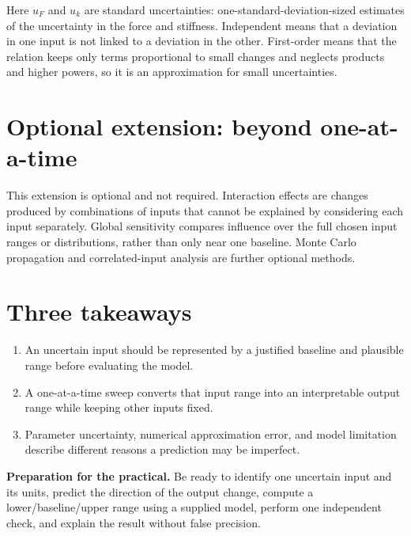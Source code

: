 \documentclass[11pt,a4paper]{article}
\begin{document}
Here $u_F$ and $u_k$ are standard uncertainties: one-standard-deviation-sized estimates of the uncertainty in the force and stiffness. Independent means that a deviation in one input is not linked to a deviation in the other. First-order means that the relation keeps only terms proportional to small changes and neglects products and higher powers, so it is an approximation for small uncertainties.

\section*{Optional extension: beyond one-at-a-time}
This extension is optional and not required. Interaction effects are changes produced by combinations of inputs that cannot be explained by considering each input separately. Global sensitivity compares influence over the full chosen input ranges or distributions, rather than only near one baseline. Monte Carlo propagation and correlated-input analysis are further optional methods.

\section*{Three takeaways}
\begin{enumerate}[nosep,leftmargin=7mm]
\item An uncertain input should be represented by a justified baseline and plausible range before evaluating the model.
\item A one-at-a-time sweep converts that input range into an interpretable output range while keeping other inputs fixed.
\item Parameter uncertainty, numerical approximation error, and model limitation describe different reasons a prediction may be imperfect.
\end{enumerate}

\begin{keybox}\textbf{Preparation for the practical.} Be ready to identify one uncertain input and its units, predict the direction of the output change, compute a lower/baseline/upper range using a supplied model, perform one independent check, and explain the result without false precision.\end{keybox}
\end{document}
